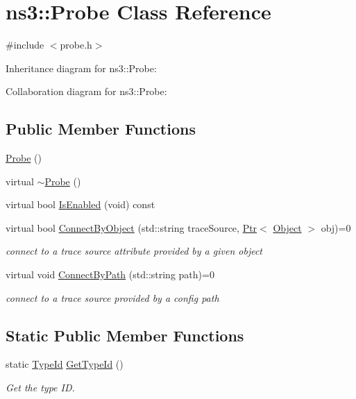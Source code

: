 \hypertarget{classns3_1_1Probe}{}\section{ns3\+:\+:Probe Class Reference}
\label{classns3_1_1Probe}


{\ttfamily \#include $<$probe.\+h$>$}



Inheritance diagram for ns3\+:\+:Probe\+:


Collaboration diagram for ns3\+:\+:Probe\+:
\subsection*{Public Member Functions}
\begin{DoxyCompactItemize}
\item 
\hyperlink{classns3_1_1Probe_ae262b79f89f2535c8e26be93ce582ac6}{Probe} ()
\item 
virtual \hyperlink{classns3_1_1Probe_af583722eed5881a33fba046adc3e8296}{$\sim$\+Probe} ()
\item 
virtual bool \hyperlink{classns3_1_1Probe_a201d605485aaa1c96b973656d6eb56eb}{Is\+Enabled} (void) const 
\item 
virtual bool \hyperlink{classns3_1_1Probe_a6f0fcc1f7ab07ac175807f7d7623d4cf}{Connect\+By\+Object} (std\+::string trace\+Source, \hyperlink{classns3_1_1Ptr}{Ptr}$<$ \hyperlink{classns3_1_1Object}{Object} $>$ obj)=0
\begin{DoxyCompactList}\small\item\em connect to a trace source attribute provided by a given object \end{DoxyCompactList}\item 
virtual void \hyperlink{classns3_1_1Probe_ac12a29768ade3f6ecfc856fe75bdfe7c}{Connect\+By\+Path} (std\+::string path)=0
\begin{DoxyCompactList}\small\item\em connect to a trace source provided by a config path \end{DoxyCompactList}\end{DoxyCompactItemize}
\subsection*{Static Public Member Functions}
\begin{DoxyCompactItemize}
\item 
static \hyperlink{classns3_1_1TypeId}{Type\+Id} \hyperlink{classns3_1_1Probe_a3eb4f7558efaf5ec1869b53f2e87ab95}{Get\+Type\+Id} ()
\begin{DoxyCompactList}\small\item\em Get the type ID. \end{DoxyCompactList}\end{DoxyCompactItemize}
